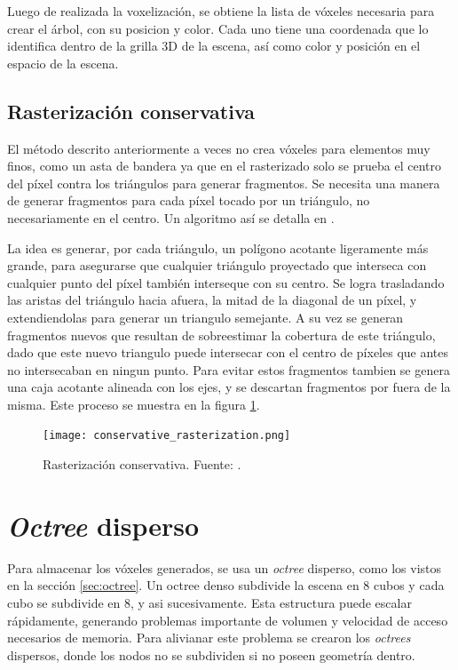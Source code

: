 Luego de realizada la voxelización, se obtiene la lista de vóxeles necesaria para crear el árbol, con su posicion y color.
Cada uno tiene una coordenada que lo identifica dentro de la grilla 3D de la escena, así como color y posición en el espacio de la escena.

\subsection{Rasterización conservativa}

El método descrito anteriormente a veces no crea vóxeles para elementos muy finos, como un asta de bandera ya que en el rasterizado solo se prueba el centro del píxel contra los triángulos para generar fragmentos. %
Se necesita una manera de generar fragmentos para cada píxel tocado por un triángulo, no necesariamente en el centro.
Un algoritmo así se detalla en \cite{conservative-rasterization}.

La idea es generar, por cada triángulo, un polígono acotante ligeramente más grande, para asegurarse que cualquier triángulo proyectado que interseca con cualquier punto del píxel también interseque con su centro.
Se logra trasladando las aristas del triángulo hacia afuera, la mitad de la diagonal de un píxel, y extendiendolas para generar un triangulo semejante.
A su vez se generan fragmentos nuevos que resultan de sobreestimar la cobertura de este triángulo, dado que este nuevo triangulo puede intersecar con el centro de píxeles que antes no intersecaban en ningun punto.
Para evitar estos fragmentos tambien se genera una caja acotante alineada con los ejes, y se descartan fragmentos por fuera de la misma.
Este proceso se muestra en la figura \ref{fig:conservative_rasterization}.

\begin{figure}[h!]
    \centering
    \texttt{[image: conservative\_rasterization.png]}
    \caption{Rasterización conservativa. Fuente: \cite{opengl-insights}.}
    \label{fig:conservative_rasterization}
\end{figure}

\section{\textit{Octree} disperso}

Para almacenar los vóxeles generados, se usa un \textit{octree} disperso, como los vistos en la sección \ref{sec:octree}.
Un octree denso subdivide la escena en 8 cubos y cada cubo se subdivide en 8, y asi sucesivamente. Esta estructura puede escalar rápidamente, generando problemas importante de volumen y velocidad de acceso necesarios de memoria.
Para alivianar este problema se crearon los \textit{octrees} dispersos, donde los nodos no se subdividen si no poseen geometría dentro.

